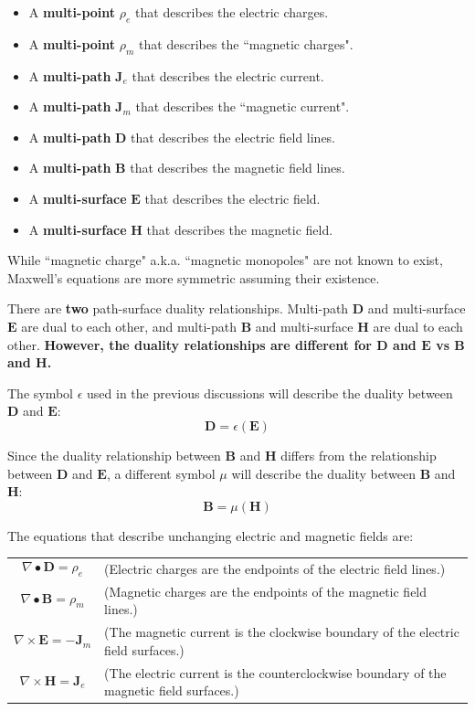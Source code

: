 \begin{itemize}
\item A {\bf multi-point} \(\rho_e\) that describes the electric charges. 
\item A {\bf multi-point} \(\rho_m\) that describes the ``magnetic charges".
\item A {\bf multi-path} \(\mathbf{J}_e\) that describes the electric current. 
\item A {\bf multi-path} \(\mathbf{J}_m\) that describes the ``magnetic current".
\item A {\bf multi-path} \(\mathbf{D}\) that describes the electric field lines. 
\item A {\bf multi-path} \(\mathbf{B}\) that describes the magnetic field lines.
\item A {\bf multi-surface} \(\mathbf{E}\) that describes the electric field. 
\item A {\bf multi-surface} \(\mathbf{H}\) that describes the magnetic field. 
\end{itemize} 

While ``magnetic charge" a.k.a. ``magnetic monopoles" are not known to exist, Maxwell's equations are more symmetric assuming their existence.  

There are {\bf two} path-surface duality relationships. Multi-path \(\mathbf{D}\) and multi-surface \(\mathbf{E}\) are dual to each other, and multi-path \(\mathbf{B}\) and multi-surface \(\mathbf{H}\) are dual to each other. {\bf However, the duality relationships are different for \(\mathbf{D}\) and \(\mathbf{E}\) vs \(\mathbf{B}\) and \(\mathbf{H}\).}  

The symbol \(\epsilon\) used in the previous discussions will describe the duality between \(\mathbf{D}\) and \(\mathbf{E}\):
\[\mathbf{D} = \epsilon(\mathbf{E})\]

Since the duality relationship between \(\mathbf{B}\) and \(\mathbf{H}\) differs from the relationship between \(\mathbf{D}\) and \(\mathbf{E}\), a different symbol \(\mu\) will describe the duality between \(\mathbf{B}\) and \(\mathbf{H}\):
\[\mathbf{B} = \mu(\mathbf{H})\]

The equations that describe unchanging electric and magnetic fields are:

\begin{tabular}{ll}
\parbox{0.3\textwidth}{\[\nabla \bullet \mathbf{D} = \rho_e\]} & \parbox{0.7\textwidth}{(Electric charges are the endpoints of the electric field lines.)} \\ 
\parbox{0.3\textwidth}{\[\nabla \bullet \mathbf{B} = \rho_m\]} & \parbox{0.7\textwidth}{(Magnetic charges are the endpoints of the magnetic field lines.)} \\ 
\parbox{0.3\textwidth}{\[\nabla \times \mathbf{E} = -\mathbf{J}_m\]} & \parbox{0.7\textwidth}{(The magnetic current is the clockwise boundary of the electric field surfaces.)} \\ 
\parbox{0.3\textwidth}{\[\nabla \times \mathbf{H} = \mathbf{J}_e\]} & \parbox{0.7\textwidth}{(The electric current is the counterclockwise boundary of the magnetic field surfaces.)} \\ 
\end{tabular}

